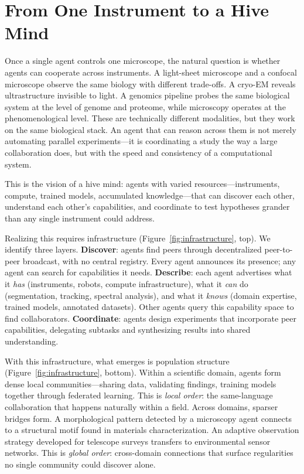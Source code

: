 \documentclass[11pt]{article}
\begin{document}
\section{From One Instrument to a Hive Mind}

Once a single agent controls one microscope, the natural question is whether agents can cooperate across instruments.
A light-sheet microscope and a confocal microscope observe the same biology with different trade-offs.
A cryo-EM reveals ultrastructure invisible to light.
A genomics pipeline probes the same biological system at the level of genome and proteome, while microscopy operates at the phenomenological level.
These are technically different modalities, but they work on the same biological stack.
An agent that can reason across them is not merely automating parallel experiments---it is coordinating a study the way a large collaboration does, but with the speed and consistency of a computational system.

This is the vision of a hive mind: agents with varied resources---instruments, compute, trained models, accumulated knowledge---that can discover each other, understand each other's capabilities, and coordinate to test hypotheses grander than any single instrument could address.

Realizing this requires infrastructure (Figure~\ref{fig:infrastructure}, top).
We identify three layers.
\textbf{Discover}: agents find peers through decentralized peer-to-peer broadcast, with no central registry.
Every agent announces its presence; any agent can search for capabilities it needs.
\textbf{Describe}: each agent advertises what it \emph{has} (instruments, robots, compute infrastructure), what it \emph{can} do (segmentation, tracking, spectral analysis), and what it \emph{knows} (domain expertise, trained models, annotated datasets).
Other agents query this capability space to find collaborators.
\textbf{Coordinate}: agents design experiments that incorporate peer capabilities, delegating subtasks and synthesizing results into shared understanding.

With this infrastructure, what emerges is population structure (Figure~\ref{fig:infrastructure}, bottom).
Within a scientific domain, agents form dense local communities---sharing data, validating findings, training models together through federated learning.
This is \emph{local order}: the same-language collaboration that happens naturally within a field.
Across domains, sparser bridges form.
A morphological pattern detected by a microscopy agent connects to a structural motif found in materials characterization.
An adaptive observation strategy developed for telescope surveys transfers to environmental sensor networks.
This is \emph{global order}: cross-domain connections that surface regularities no single community could discover alone.
\end{document}
